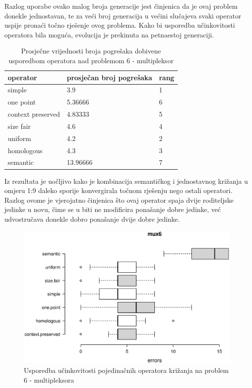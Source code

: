Razlog uporabe ovako malog broja generacije jest činjenica da je ovaj problem donekle jednostavan, te za veći broj generacija u većini slučajeva svaki operator uspije pronaći točno rješenje ovog problema. Kako bi usporedba učinkovitosti operatora bila moguća, evolucija je prekinuta na petnaestoj generaciji.

\begin{table}[H]
 	\centering
\caption{Prosječne vrijednosti broja pogrešaka dobivene usporedbom operatora nad problemom 6 - multipleksor}
    \begin{tabular}{| l | l | l |}
    \hline
    \textbf{operator}  & \textbf{prosječan broj pogrešaka} & \textbf{rang}\\ \hline
    simple & 3.9 & 1\\ \hline
    one point & 5.36666 & 6\\ \hline
    context preserved & 4.83333 & 5\\ \hline
    size fair & 4.6 & 4\\ \hline
    uniform & 4.2 & 2\\ \hline
    homologous & 4.3 & 3\\ \hline
    semantic & 13.96666 & 7\\ \hline
    \end{tabular}
    
    
    \label{mux6table}
\end{table}

Iz rezultata je uočljivo kako je kombinacija semantičkog i jednostavnog križanja u omjeru 1:9 daleko sporije konvergirala točnom rješenju nego ostali operatori. Razlog ovome je vjerojatno činjenica što ovaj operator spaja dvije roditeljske jedinke u novu, čime se u biti ne modificira ponašanje dobre jedinke, već udvostručava donekle dobro ponašanje dvije dobre jedinke.

\begin{figure}[H]
	\centering
	\includegraphics[trim=0cm 4cm 0cm 0cm, scale=0.6]{./slike/boxPlots/mux6.eps}
	\caption{Usporedba učinkovitosti pojedinačnih operatora križanja na problem 6 - multipleksora}
	\label{muxbox}
\end{figure}

